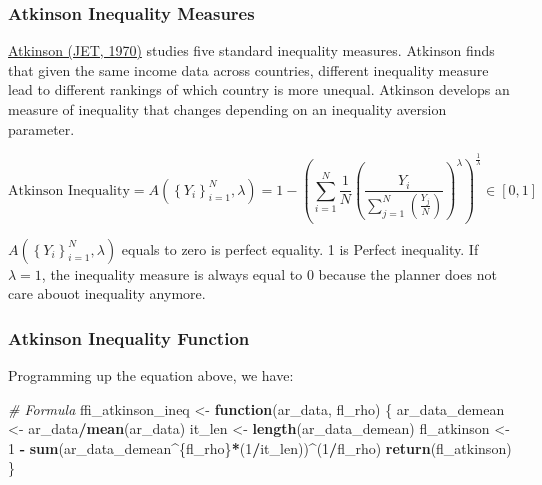 \documentclass[
]{book}
\newenvironment{Shaded}{\begin{snugshade}}{\end{snugshade}}
\newcommand{\CommentTok}[1]{\textcolor[rgb]{0.56,0.35,0.01}{\textit{#1}}}
\newcommand{\ControlFlowTok}[1]{\textcolor[rgb]{0.13,0.29,0.53}{\textbf{#1}}}
\newcommand{\DecValTok}[1]{\textcolor[rgb]{0.00,0.00,0.81}{#1}}
\newcommand{\KeywordTok}[1]{\textcolor[rgb]{0.13,0.29,0.53}{\textbf{#1}}}
\newcommand{\NormalTok}[1]{#1}
\newcommand{\OperatorTok}[1]{\textcolor[rgb]{0.81,0.36,0.00}{\textbf{#1}}}
\newcommand{\StringTok}[1]{\textcolor[rgb]{0.31,0.60,0.02}{#1}}
\begin{document}
\hypertarget{atkinson-inequality-measures}{%
\subsubsection{Atkinson Inequality Measures}\label{atkinson-inequality-measures}}

\href{https://linkinghub.elsevier.com/retrieve/pii/0022053170900396}{Atkinson (JET, 1970)} studies five standard inequality measures. Atkinson finds that given the same income data across countries, different inequality measure lead to different rankings of which country is more unequal. Atkinson develops an measure of inequality that changes depending on an inequality aversion parameter.

\[
\text{Atkinson Inequality} = 
A\left(
\left\{Y_i\right\}_{i=1}^N,
\lambda
\right) 
= 1 - 
\left(
\sum_{i=1}^N \frac{1}{N}
  \left(
    \frac{Y_i}{\sum_{j=1}^N \left( \frac{Y_j}{N} \right) }
  \right)^{\lambda}  
\right)^{\frac{1}{\lambda}}
\in \left[0,1\right]
\]

\(A\left(\left\{Y_i\right\}_{i=1}^N,\lambda\right)\) equals to zero is perfect equality. 1 is Perfect inequality. If \(\lambda=1\), the inequality measure is always equal to 0 because the planner does not care abouot inequality anymore.

\hypertarget{atkinson-inequality-function}{%
\subsubsection{Atkinson Inequality Function}\label{atkinson-inequality-function}}

Programming up the equation above, we have:

\begin{Shaded}
\begin{Highlighting}[]
\CommentTok{\# Formula}
\NormalTok{ffi\_atkinson\_ineq \textless{}{-}}\StringTok{ }\ControlFlowTok{function}\NormalTok{(ar\_data, fl\_rho) \{}
\NormalTok{  ar\_data\_demean \textless{}{-}}\StringTok{ }\NormalTok{ar\_data}\OperatorTok{/}\KeywordTok{mean}\NormalTok{(ar\_data)}
\NormalTok{  it\_len \textless{}{-}}\StringTok{ }\KeywordTok{length}\NormalTok{(ar\_data\_demean)}
\NormalTok{  fl\_atkinson \textless{}{-}}\StringTok{ }\DecValTok{1} \OperatorTok{{-}}\StringTok{ }\KeywordTok{sum}\NormalTok{(ar\_data\_demean}\OperatorTok{\^{}}\NormalTok{\{fl\_rho\}}\OperatorTok{*}\NormalTok{(}\DecValTok{1}\OperatorTok{/}\NormalTok{it\_len))}\OperatorTok{\^{}}\NormalTok{(}\DecValTok{1}\OperatorTok{/}\NormalTok{fl\_rho)}
  \KeywordTok{return}\NormalTok{(fl\_atkinson)}
\NormalTok{\}}
\end{Highlighting}
\end{Shaded}
\end{document}
